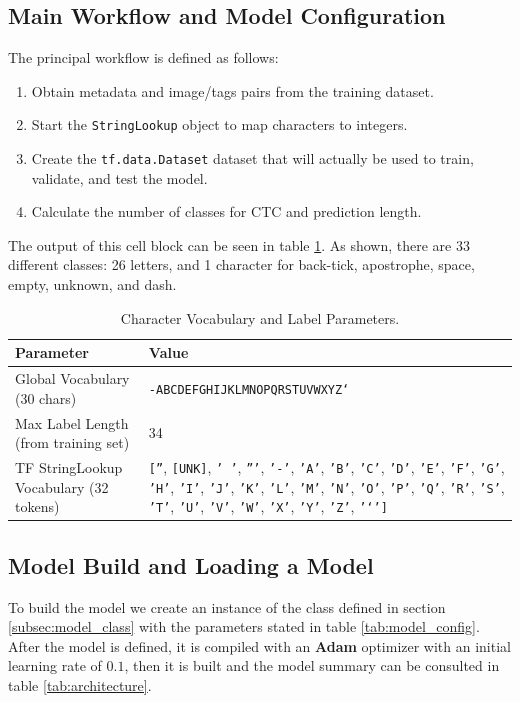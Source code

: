\documentclass[11pt,letterpaper]{article}
\begin{document}
	\subsection{Main Workflow and Model Configuration}
	The principal workflow is defined as follows:
	\begin{enumerate}
		\item Obtain metadata and image/tags pairs from the training dataset.
		\item Start the \texttt{StringLookup} object to map characters to integers.
		\item Create the \texttt{tf.data.Dataset} dataset that will actually be used to train, validate, and test the model.
		\item Calculate the number of classes for CTC and prediction length.
	\end{enumerate}
	
	The output of this cell block can be seen in table \ref{tab:vocab_params}. As shown, there are 33 different classes: 26 letters, and 1 character for back-tick, apostrophe, space, empty, unknown, and dash.
	
	\begin{table}[!h]
		\centering
		\begin{tabular}{|l|p{10cm}|}
			\hline
			\textbf{Parameter} & \textbf{Value} \\
			\hline
			Global Vocabulary (30 chars) & \texttt{-ABCDEFGHIJKLMNOPQRSTUVWXYZ` } \\
			\hline
			Max Label Length (from training set) & 34 \\
			\hline
			TF StringLookup Vocabulary (32 tokens) &
			\texttt{[''}, \texttt{[UNK]}, \texttt{' '}, \texttt{'''}, \texttt{'-'}, \texttt{'A'}, \texttt{'B'}, \texttt{'C'}, \texttt{'D'}, \texttt{'E'}, \texttt{'F'}, \texttt{'G'}, \texttt{'H'}, \texttt{'I'}, \texttt{'J'}, \texttt{'K'}, \texttt{'L'}, \texttt{'M'}, \texttt{'N'}, \texttt{'O'}, \texttt{'P'}, \texttt{'Q'}, \texttt{'R'}, \texttt{'S'}, \texttt{'T'}, \texttt{'U'}, \texttt{'V'}, \texttt{'W'}, \texttt{'X'}, \texttt{'Y'}, \texttt{'Z'}, \texttt{'`']} \\
			\hline
		\end{tabular}
		\caption{Character Vocabulary and Label Parameters.}
		\label{tab:vocab_params}
	\end{table}
	
	\newpage
	
	\subsection{Model Build and Loading a Model}
	To build the model we create an instance of the class defined in section \ref{subsec:model_class} with the parameters stated in table \ref{tab:model_config}. After the model is defined, it is compiled with an \textbf{Adam} optimizer with an initial learning rate of $0.1$, then it is built and the model summary can be consulted in table \ref{tab:architecture}.
	
\end{document}
